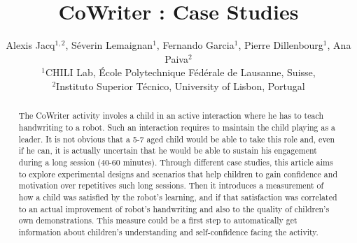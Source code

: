 \documentclass{sig-alternate}
\begin{document}

\title{CoWriter : Case Studies}

\author{Alexis Jacq$^{1,2}$, S\'everin Lemaignan$^1$, Fernando Garcia$^1$, Pierre Dillenbourg$^1$, Ana Paiva$^2$\\
$^1$CHILI Lab, \'Ecole Polytechnique F\'ed\'erale de Lausanne, Suisse,\\
$^2$Instituto Superior T\'{e}cnico, University of Lisbon, Portugal}


%
%


\maketitle
\begin{abstract}

The CoWriter activity involes a child in an active interaction where he has to
teach handwriting to a robot. Such an interaction requires to maintain
the child playing as a leader. It is not obvious that a 5-7 aged child
would be able to take this role and, even if he can, it is actually
uncertain that he would be able to sustain
his engagement during a long session (40-60 minutes). Through different case
studies, this article aims to explore experimental designs and scenarios that
help children to gain confidence and motivation over repetitives such long
sessions. Then it introduces a measurement of how a child was satisfied
by the robot's learning, and if that satisfaction was correlated to an actual
improvement of robot's handwriting and also to the quality of children's own
demonstrations. This measure could  be a first step to automatically get
information about children's understanding and self-confidence
facing the activity.

\end{abstract}
\end{document}
